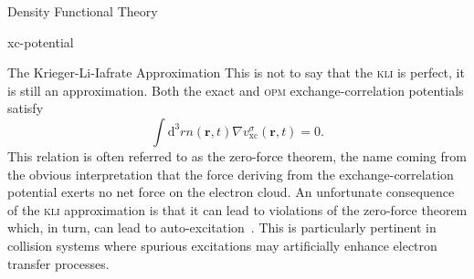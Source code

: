 \documentclass[letterpaper, 11 pt]{report}
\begin{document}
\begin{chapter}{Density Functional Theory \label{chap:dft}}
\begin{section}{xc-potential \label{sec:xcpot}}
\begin{subsection}{The Krieger-Li-Iafrate Approximation \label{sec:kli}}
         This is not to say that the \textsc{kli} is perfect, it is still an approximation. Both the
         exact and \textsc{opm} exchange-correlation potentials satisfy
         \begin{equation} \label{eq:zft}
            \int \mathrm{d}^3 r n(\mathbf{r}, t) \nabla v^\sigma_\mathrm{xc}(\mathbf{r},t) = 0.
         \end{equation}
         This relation is often referred to as the zero-force theorem, the name coming from the obvious
         interpretation that the force deriving from the exchange-correlation potential exerts no net
         force on the electron cloud. An unfortunate consequence of the \textsc{kli} approximation is
         that it can lead to violations of the zero-force theorem which, in turn, can lead to
         auto-excitation~\cite{kli-zero-force}. This is particularly pertinent in collision systems
         where spurious excitations may artificially enhance electron transfer processes.
 
      \end{subsection}

   \end{section}

\end{chapter}
\end{document}
